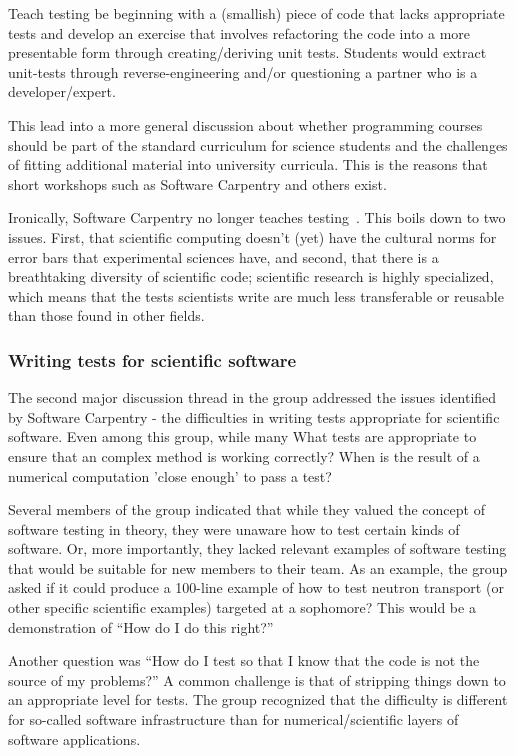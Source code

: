 \documentclass[11pt, oneside]{amsart}
\begin{document}
Teach testing be beginning with a (smallish) piece of code that lacks
appropriate tests and develop an exercise that involves refactoring the code
into a more presentable form through creating/deriving unit tests. Students
would extract unit-tests through reverse-engineering and/or questioning a
partner who is a developer/expert.

This lead into a more general discussion about whether programming courses
should be part of the standard curriculum for science students and the
challenges of fitting additional material into university curricula. This is the
reasons that short workshops such as Software Carpentry and others exist.

Ironically, Software Carpentry no longer teaches testing~\cite{SCtesting}. This
boils down to two issues. First, that scientific computing doesn't (yet) have
the cultural norms for error bars that experimental sciences have, and second,
that there is a breathtaking diversity of scientific code; scientific research
is highly specialized, which means that the tests scientists write are much less
transferable or reusable than those found in other fields.

\subsubsection{Writing tests for scientific software}
The second major discussion thread in the group addressed the issues identified
by Software Carpentry - the difficulties in writing tests appropriate for
scientific software. Even among this group, while many What tests are
appropriate to ensure that an complex method is working correctly? When is the
result of a numerical computation 'close enough' to pass a test?
 
Several members of the group indicated that while they valued the concept of
software testing in theory, they were unaware how to test certain kinds of
software. Or, more importantly, they lacked relevant examples of software
testing that would be suitable for new members to their team. As an example, the
group asked if it could produce a 100-line example of how to test neutron
transport (or other specific scientific examples) targeted at a sophomore? This
would be a demonstration of ``How do I do this right?''

Another question was ``How do I test so that I know that the code is not the
source of my problems?'' A common challenge is that of stripping things down to
an appropriate level for tests. The group recognized that the difficulty is
different for so-called software infrastructure than for numerical/scientific
layers of software applications.
\end{document}
